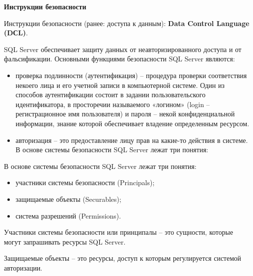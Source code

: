 \clearpage
\textbf{Инструкции безопасности}

Инструкции безопасности (ранее: доступа к данным): \textbf{Data Control Language (DСL)}.

SQL Server обеспечивает защиту данных от неавторизированного доступа и от фальсификации. Основными функциями безопасности SQL Server являются:
\begin{itemize}
	\item проверка подлинности (аутентификация) – процедура проверки соответствия некоего лица и его учетной записи в компьютерной системе. Один из способов аутентификации состоит в задании пользовательского идентификатора, в просторечии называемого «логином» (login – регистрационное имя пользователя) и пароля – некой конфиденциальной информации, знание которой обеспечивает владение определенным ресурсом.
	\item авторизация – это предоставление лицу прав на какие-то действия в системе.
	В основе системы безопасности SQL Server лежат три понятия:
\end{itemize}

В основе системы безопасности SQL Server лежат три понятия:
\begin{itemize}
	\item участники системы безопасности (Principals);
	\item защищаемые объекты (Securables);
	\item система разрешений (Permissions).
\end{itemize}

Участники системы безопасности или принципалы – это сущности, которые могут запрашивать ресурсы SQL Server.

Защищаемые объекты – это ресурсы, доступ к которым регулируется системой авторизации.

